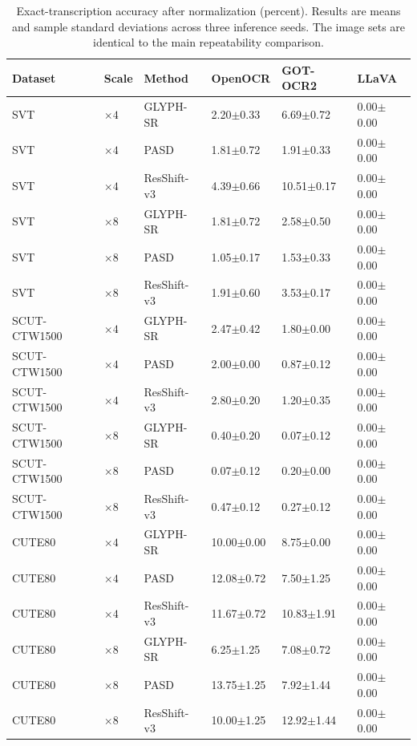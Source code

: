 \begin{table}[H]
\centering
\caption{Exact-transcription accuracy after normalization (percent). Results are means and sample standard deviations across three inference seeds. The image sets are identical to the main repeatability comparison.}
\label{tab:ar-main-exact-accuracy}
\small
\setlength{\tabcolsep}{4pt}
\begin{tabular}{llllll}
\toprule
Dataset & Scale & Method & OpenOCR & GOT-OCR2 & LLaVA \\
\midrule
SVT & $\times4$ & GLYPH-SR & 2.20$\pm$0.33 & 6.69$\pm$0.72 & 0.00$\pm$0.00 \\
SVT & $\times4$ & PASD & 1.81$\pm$0.72 & 1.91$\pm$0.33 & 0.00$\pm$0.00 \\
SVT & $\times4$ & ResShift-v3 & 4.39$\pm$0.66 & 10.51$\pm$0.17 & 0.00$\pm$0.00 \\
SVT & $\times8$ & GLYPH-SR & 1.81$\pm$0.72 & 2.58$\pm$0.50 & 0.00$\pm$0.00 \\
SVT & $\times8$ & PASD & 1.05$\pm$0.17 & 1.53$\pm$0.33 & 0.00$\pm$0.00 \\
SVT & $\times8$ & ResShift-v3 & 1.91$\pm$0.60 & 3.53$\pm$0.17 & 0.00$\pm$0.00 \\
SCUT-CTW1500 & $\times4$ & GLYPH-SR & 2.47$\pm$0.42 & 1.80$\pm$0.00 & 0.00$\pm$0.00 \\
SCUT-CTW1500 & $\times4$ & PASD & 2.00$\pm$0.00 & 0.87$\pm$0.12 & 0.00$\pm$0.00 \\
SCUT-CTW1500 & $\times4$ & ResShift-v3 & 2.80$\pm$0.20 & 1.20$\pm$0.35 & 0.00$\pm$0.00 \\
SCUT-CTW1500 & $\times8$ & GLYPH-SR & 0.40$\pm$0.20 & 0.07$\pm$0.12 & 0.00$\pm$0.00 \\
SCUT-CTW1500 & $\times8$ & PASD & 0.07$\pm$0.12 & 0.20$\pm$0.00 & 0.00$\pm$0.00 \\
SCUT-CTW1500 & $\times8$ & ResShift-v3 & 0.47$\pm$0.12 & 0.27$\pm$0.12 & 0.00$\pm$0.00 \\
CUTE80 & $\times4$ & GLYPH-SR & 10.00$\pm$0.00 & 8.75$\pm$0.00 & 0.00$\pm$0.00 \\
CUTE80 & $\times4$ & PASD & 12.08$\pm$0.72 & 7.50$\pm$1.25 & 0.00$\pm$0.00 \\
CUTE80 & $\times4$ & ResShift-v3 & 11.67$\pm$0.72 & 10.83$\pm$1.91 & 0.00$\pm$0.00 \\
CUTE80 & $\times8$ & GLYPH-SR & 6.25$\pm$1.25 & 7.08$\pm$0.72 & 0.00$\pm$0.00 \\
CUTE80 & $\times8$ & PASD & 13.75$\pm$1.25 & 7.92$\pm$1.44 & 0.00$\pm$0.00 \\
CUTE80 & $\times8$ & ResShift-v3 & 10.00$\pm$1.25 & 12.92$\pm$1.44 & 0.00$\pm$0.00 \\
\bottomrule
\end{tabular}
\end{table}
